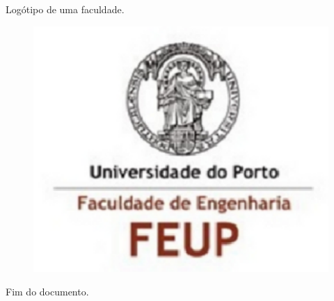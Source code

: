 \documentclass[twoside,a4paper,10pt]{article}
\begin{document}
Logótipo de uma faculdade.
\begin{figure}[!h]
\includegraphics{img.pdf}
\end{figure}
Fim do documento.
\end{document}
